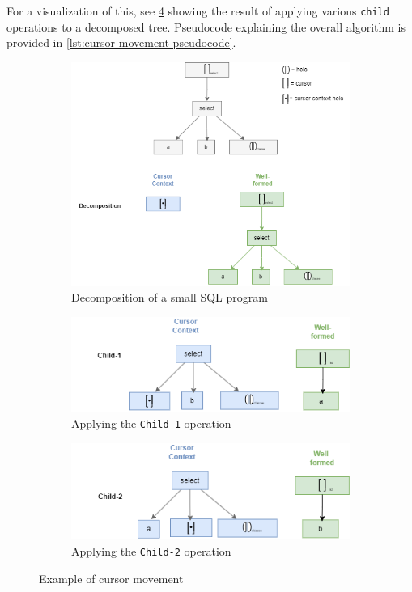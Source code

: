 For a visualization of this, see \cref{fig:movement-example} showing the result
of applying various \texttt{child} operations to a decomposed tree.
Pseudocode explaining the overall algorithm is provided in
\cref{lst:cursor-movement-pseudocode}.

\begin{figure}[H]
  \centering
  \begin{subfigure}[b]{0.9\textwidth}
    \centering
    \includegraphics[width=\textwidth]{img/slq-decomp-only.drawio.png}
    \caption{Decomposition of a small SQL program}
    \label{subfig:decomp-only}
  \end{subfigure}
  \hfill
  \begin{subfigure}[b]{0.9\textwidth}
    \centering
    \includegraphics[width=\textwidth]{img/sql-child1.drawio.png}
    \caption{Applying the \texttt{Child-1} operation}
    \label{subfig:child1}
  \end{subfigure}
  \hfill
  \begin{subfigure}[b]{0.9\textwidth}
    \centering
    \includegraphics[width=\textwidth]{img/sql-child2.drawio.png}
    \caption{Applying the \texttt{Child-2} operation}
    \label{subfig:child2}
  \end{subfigure}
  \caption{Example of cursor movement}
  \label{fig:movement-example}
\end{figure}

